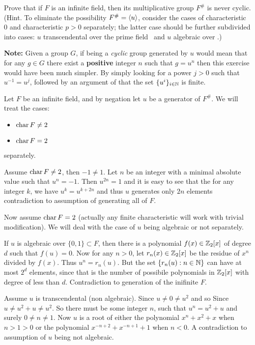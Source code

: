 \begin{myenumerate}

\item
\begin{excopy}
Prove that if $F$ is an infinite field, then its
multiplicative group \(F^{\#}\) is never cyclic.
(Hint. To eliminate the possibility
 \(F^{\#} = \lrangle{u}\),  consider the cases of
characteristic $0$ and characteristic \(p>0\)
separately; the latter case should
be further subdivided into cases:
$u$ transcendental over the prime field
\Zp\ and $u$ algebraic over \Zp.)
\end{excopy}

\textbf{Note:} Given a group $G$, if being a \emph{cyclic}
group generated by $u$
would mean that for any \(g\in G\) there exist a \textbf{positive} integer $n$
such that \(g=u^n\) then this exercise would have been much simpler.
By simply looking for a power \(j>0\) such that \(u^{-1}=u^j\),
followed by an argument of that the set \(\{u^i\}_{i\in \mathbb{N}}\) is finite.

\iffalse
Assume \(\fchar F = 0\) and by negation \(F^{\#} = \lrangle{u}\).
We have already seen (in Theorem~31 \cite{Rotman98}) that its prime
field is isomorphic to \Q.
Now let $n$ be the minimal absolute such that
\(u^n\in \Q\) or \(u^{-n}\in\Q\).
\fi

Let  $F$ be an infinite field, and by negation
let $u$ be a generator of \(F^{\#}\).
We will treat the cases:
\begin{itemize}
 \item \(\mathop{\rm char}\nolimits F \neq 2\)
 \item \(\mathop{\rm char}\nolimits F = 2\)
\end{itemize}
separately.

Assume \(\mathop{\rm char}\nolimits F \neq 2\), then \(-1 \neq 1\). Let $n$ be an integer
with a minimal absolute value such that \(u^n=-1\).
Then \(u^{2n}=1\) and it is easy to see that
the for any integer $k$, we have \(u^k=u^{k+2n}\) and
thus $u$  generates only $2n$ elements contradiction
to assumption of generating all of $F$.

Now assume \(\mathop{\rm char}\nolimits F = 2\) (actually any finite characteristic
will work with trivial modification). We will deal
with the case of $u$ being algebraic or not separately.

If $u$ is algebraic over
\(\{0,1\}\subset F\), then there is a polynomial \(f(x)\in \mathbb{Z}_2[x]\)
of degree $d$ such that \(f(u)=0\).
Now for any \(n>0\),
let \(r_n(x)\in\mathbb{Z}_2[x]\) be the residue
of \(x^n\) divided by \(f(x)\).
Thus \(u^n = r_n(u)\). But the set \(\{r_n(u): n\in \mathbb{N}\}\)
can have at most \(2^d\) elements, since that is the number of
possibile polynomials in \(\mathbb{Z}_2[x]\) with degree of less than $d$.
Contradiction to generation of the inifinite $F$.

Assume $u$ is transcendental (non algebraic).
Since \(u\neq 0 \neq u^2\) and so
Since \(u\neq u^2+u \neq u^2\).
So there must be some integer $n$, such that
\(u^n=u^2+u\) and surely \(0\neq n \neq 1\).
Now $u$ is a root of either the polynomial
\(x^n+x^2+x\) when \(n>1>0\)
or the polynomial \(x^{-n+2}+x^{-n+1}+1\) when \(n<0\).
A contradiction to assumption of $u$ being not algebraic.


\end{myenumerate}
